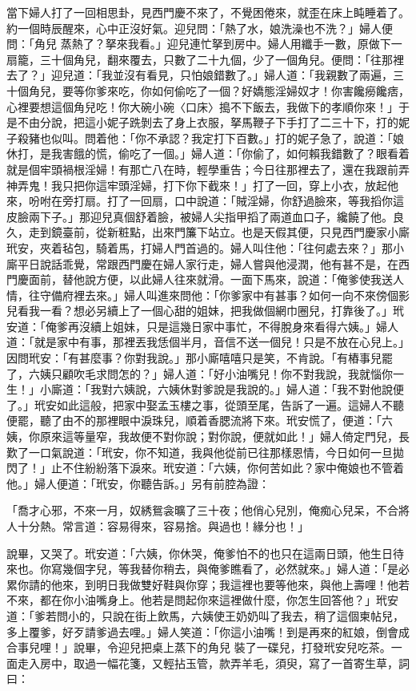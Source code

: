 \begin{showcontents}{}
當下婦人打了一回相思卦，見西門慶不來了，不覺困倦來，就歪在床上盹睡着了。約一個時辰醒來，心中正沒好氣。迎兒問：「熱了水，娘洗澡也不洗？」婦人便問：「角兒 蒸熱了？拏來我看。」迎兒連忙拏到房中。婦人用纖手一數，原做下一扇籠，三十個角兒，翻來覆去，只數了二十九個，少了一個角兒。便問：「往那裡去了？」迎兒道：「我並沒有看見，只怕娘錯數了。」婦人道：「我親數了兩遍，三十個角兒，要等你爹來吃，你如何偷吃了一個？好嬌態淫婦奴才！你害饞癆饞痞，心裡要想這個角兒吃！你大碗小碗〈口床〉搗不下飯去，我做下的孝順你來！」于是不由分說，把這小妮子跣剝去了身上衣服，拏馬鞭子下手打了二三十下，打的妮子殺豬也似叫。問着他：「你不承認？我定打下百數。」打的妮子急了，說道：「娘休打，是我害餓的慌，偷吃了一個。」婦人道：「你偷了，如何賴我錯數了？眼看着就是個牢頭禍根淫婦！有那亡八在時，輕學重告；今日往那裡去了，還在我跟前弄神弄鬼！我只把你這牢頭淫婦，打下你下截來！」打了一回，穿上小衣，放起他來，吩咐在旁打扇。打了一回扇，口中說道：「賊淫婦，你舒過臉來，等我搯你這皮臉兩下子。」那迎兒真個舒着臉，被婦人尖指甲搯了兩道血口子，纔饒了他。良久，走到鏡臺前，從新粧點，出來門簾下站立。也是天假其便，只見西門慶家小廝玳安，夾着毡包，騎着馬，打婦人門首過的。婦人叫住他：「往何處去來？」那小廝平日說話乖覺，常跟西門慶在婦人家行走，婦人嘗與他浸潤，他有甚不是，在西門慶面前，替他說方便，以此婦人往來就滑。一面下馬來，說道：「俺爹使我送人情，往守備府裡去來。」婦人叫進來問他：「你爹家中有甚事？如何一向不來傍個影兒看我一看？想必另續上了一個心甜的姐妹，把我做個網巾圈兒，打靠後了。」玳安道：「俺爹再沒續上姐妹，只是這幾日家中事忙，不得脫身來看得六姨。」婦人道：「就是家中有事，那裡丟我恁個半月，音信不送一個兒！只是不放在心兒上。」因問玳安：「有甚麼事？你對我說。」那小廝嘻嘻只是笑，不肯說。「有樁事兒罷了，六姨只顧吹毛求問怎的？」婦人道：「好小油嘴兒！你不對我說，我就惱你一生！」小廝道：「我對六姨說，六姨休對爹說是我說的。」婦人道：「我不對他說便了。」玳安如此這般，把家中娶孟玉樓之事，從頭至尾，告訴了一遍。這婦人不聽便罷，聽了由不的那裡眼中淚珠兒，順着香腮流將下來。玳安慌了，便道：「六姨，你原來這等量窄，我故便不對你說；對你說，便就如此！」婦人倚定門兒，長歎了一口氣說道：「玳安，你不知道，我與他從前已往那樣恩情，今日如何一旦拋閃了！」止不住紛紛落下淚來。玳安道：「六姨，你何苦如此？家中俺娘也不管着他。」婦人便道：「玳安，你聽告訴。」另有前腔為證：

「喬才心邪，不來一月，奴綉鴛衾曠了三十夜；他俏心兒別，俺痴心兒呆，不合將人十分熱。常言道：容易得來，容易捨。與過也！緣分也！」

說畢，又哭了。玳安道：「六姨，你休哭，俺爹怕不的也只在這兩日頭，他生日待來也。你寫幾個字兒，等我替你稍去，與俺爹瞧看了，必然就來。」婦人道：「是必累你請的他來，到明日我做雙好鞋與你穿；我這裡也要等他來，與他上壽哩！他若不來，都在你小油嘴身上。他若是問起你來這裡做什麼，你怎生回答他？」玳安道：「爹若問小的，只說在街上飲馬，六姨使王奶奶叫了我去，稍了這個柬帖兒，多上覆爹，好歹請爹過去哩。」婦人笑道：「你這小油嘴！到是再來的紅娘，倒會成合事兒哩！」說畢，令迎兒把桌上蒸下的角兒 裝了一碟兒，打發玳安兒吃茶。一面走入房中，取過一幅花箋，又輕拈玉管，款弄羊毛，須臾，寫了一首寄生草，詞曰：


\end{showcontents}
